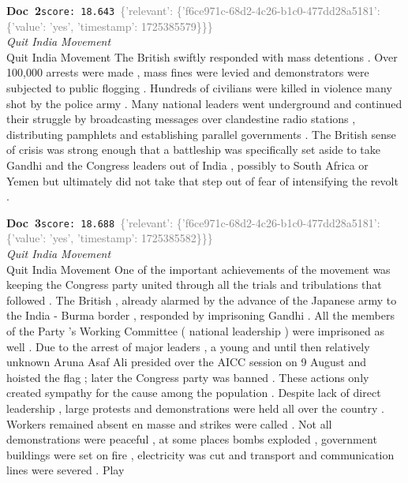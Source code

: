 \documentclass[a4paper,11pt]{article}
\begin{document}
\begin{docenv}
{\footnotesize\textcolor{doccolor}{\textbf{Doc~2}}}\hfill{\tiny\texttt{score:~18.643}}\ {\tiny\textcolor{gray}{\{'relevant': \{'f6ce971c-68d2-4c26-b1c0-477dd28a5181': \{'value': 'yes', 'timestamp': 1725385579\}\}\}}}\\[3pt]
{\small\textit{Quit India Movement}}\\[2pt]
\vspace{2pt}
{\footnotesize Quit India Movement
The British swiftly responded with mass detentions . Over 100,000 arrests were made , mass fines were levied and demonstrators were subjected to public flogging . Hundreds of civilians were killed in violence many shot by the police army . Many national leaders went underground and continued their struggle by broadcasting messages over clandestine radio stations , distributing pamphlets and establishing parallel governments . The British sense of crisis was strong enough that a battleship was specifically set aside to take Gandhi and the Congress leaders out of India , possibly to South Africa or Yemen but ultimately did not take that step out of fear of intensifying the revolt .}
\end{docenv}
\begin{docenv}
{\footnotesize\textcolor{doccolor}{\textbf{Doc~3}}}\hfill{\tiny\texttt{score:~18.688}}\ {\tiny\textcolor{gray}{\{'relevant': \{'f6ce971c-68d2-4c26-b1c0-477dd28a5181': \{'value': 'yes', 'timestamp': 1725385582\}\}\}}}\\[3pt]
{\small\textit{Quit India Movement}}\\[2pt]
\vspace{2pt}
{\footnotesize Quit India Movement
One of the important achievements of the movement was keeping the Congress party united through all the trials and tribulations that followed . The British , already alarmed by the advance of the Japanese army to the India - Burma border , responded by imprisoning Gandhi . All the members of the Party 's Working Committee ( national leadership ) were imprisoned as well . Due to the arrest of major leaders , a young and until then relatively unknown Aruna Asaf Ali presided over the AICC session on 9 August and hoisted the flag ; later the Congress party was banned . These actions only created sympathy for the cause among the population . Despite lack of direct leadership , large protests and demonstrations were held all over the country . Workers remained absent en masse and strikes were called . Not all demonstrations were peaceful , at some places bombs exploded , government buildings were set on fire , electricity was cut and transport and communication lines were severed . Play}
\end{docenv}
\end{document}

